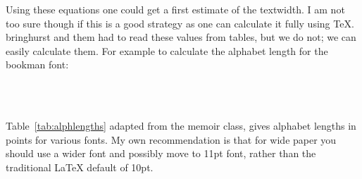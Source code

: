 Using these equations one could get a first estimate of the textwidth. I am not too sure though if this is a good strategy as one can calculate it fully using TeX. bringhurst and them had to read these values from tables, but we do not; we can easily calculate them. For example to calculate the alphabet length for the bookman font:

\begin{texexample}{}{}
  \bgroup
  \selectfont\alphabetlength\\
  \charactersperline\\
  \the\textwidth
  \egroup
\end{texexample}

Table~\ref{tab:alphlengths} adapted from the memoir class, gives alphabet lengths in points for various
fonts. My own recommendation is that for wide paper you should use a wider font and possibly move to 11pt font, rather than the traditional LaTeX default of 10pt.

